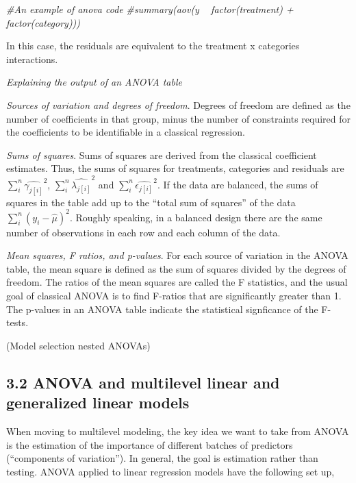 \documentclass[12pt,]{article}
\newenvironment{Shaded}{\begin{snugshade}}{\end{snugshade}}
\newcommand{\CommentTok}[1]{\textcolor[rgb]{0.56,0.35,0.01}{\textit{#1}}}
\begin{document}
\begin{Shaded}
\begin{Highlighting}[]
\CommentTok{#An example of anova code }
\CommentTok{#summary(aov(y ~ factor(treatment) + factor(category)))}
\end{Highlighting}
\end{Shaded}

In this case, the residuals are equivalent to the treatment x categories
interactions.

\textit{Explaining the output of an ANOVA table}

\textit{Sources of variation and degrees of freedom}. Degrees of freedom
are defined as the number of coefficients in that group, minus the
number of constraints required for the coefficients to be identifiable
in a classical regression.

\textit{Sums of squares}. Sums of squares are derived from the classical
coefficient estimates. Thus, the sums of squares for treatments,
categories and residuals are \(\sum_i^{n} \hat{\gamma_{j[i]}}^2\),
\(\sum_i^{n} \hat{\lambda_{j[i]}}^2\) and
\(\sum_i^{n} \hat{\epsilon_{j[i]}}^2\). If the data are balanced, the
sums of squares in the table add up to the ``total sum of squares'' of
the data \(\sum_i^n(y_i - \hat{\mu})^2\). Roughly speaking, in a
balanced design there are the same number of observations in each row
and each column of the data.

\textit{Mean squares, F ratios, and p-values}. For each source of
variation in the ANOVA table, the mean square is defined as the sum of
squares divided by the degrees of freedom. The ratios of the mean
squares are called the F statistics, and the usual goal of classical
ANOVA is to find F-ratios that are significantly greater than 1. The
p-values in an ANOVA table indicate the statistical signficance of the
F-tests.

(Model selection nested ANOVAs)

\subsection{3.2 ANOVA and multilevel linear and generalized linear
models}\label{anova-and-multilevel-linear-and-generalized-linear-models}

When moving to multilevel modeling, the key idea we want to take from
ANOVA is the estimation of the importance of different batches of
predictors (``components of variation''). In general, the goal is
estimation rather than testing. ANOVA applied to linear regression
models have the following set up,
\end{document}
